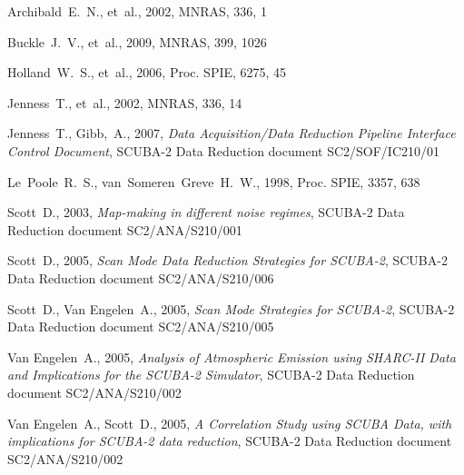 \documentclass[twoside,11pt]{article}
\newcommand{\xref}[3]{#1}
\renewcommand{\_}{\texttt{\symbol{95}}}
\begin{document}
\begin{thebibliography}{}

Archibald~E.~N., et~al., 2002, MNRAS, 336, 1

Buckle~J.~V., et~al., 2009, MNRAS, 399, 1026




Holland~W.~S., et~al., 2006, Proc. SPIE, 6275, 45

Jenness~T., et~al., 2002, MNRAS, 336, 14

Jenness~T., Gibb,~A., 2007, \textit{Data Acquisition/Data Reduction
  Pipeline Interface Control Document}, SCUBA-2 Data Reduction
document SC2/SOF/IC210/01

Le~Poole~R.~S., van~Someren~Greve~H.~W., 1998, Proc. SPIE, 3357, 638

Scott~D., 2003, {\it Map-making in different noise regimes}, SCUBA-2
  Data Reduction document SC2/ANA/S210/001

Scott~D., 2005, {\it Scan Mode Data Reduction Strategies for
  SCUBA-2}, SCUBA-2 Data Reduction document SC2/ANA/S210/006

Scott~D., Van Engelen~A., 2005, {\it Scan Mode Strategies for
  SCUBA-2}, SCUBA-2 Data Reduction document SC2/ANA/S210/005

Van Engelen~A., 2005, {\it Analysis of Atmospheric Emission using
  SHARC-II Data and Implications for the SCUBA-2 Simulator},
  SCUBA-2 Data Reduction document SC2/ANA/S210/002

Van Engelen~A., Scott~D., 2005, {\it A Correlation Study using SCUBA
  Data, with implications for SCUBA-2 data reduction},
  SCUBA-2 Data Reduction document SC2/ANA/S210/002



\end{thebibliography}
\end{document}
